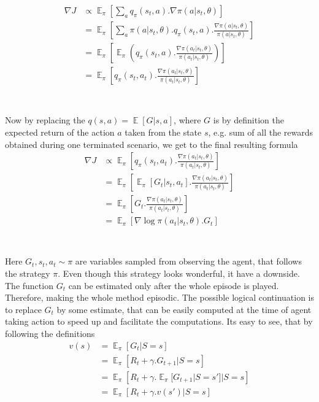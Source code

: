 \documentclass{article}
\DeclareMathOperator{\E}{\mathbb{E}}
\begin{document}
\begin{equation*}
    \begin{aligned}
    \nabla J
    &\propto \E_\pi \left[\sum_a q_\pi (s_t, a) .\nabla \pi(a |s_t, \theta)\right]\\
    &=\E_\pi \left[\sum_a \pi(a|s_t, \theta) .q_\pi(s_t, a) .\frac{\nabla \pi(a |s_t, \theta)}{\pi(a|s_t, \theta)}\right]\\
    &=\E_\pi \left[\E_\pi \left( q_\pi(s_t, a) .\frac{\nabla \pi(a_t |s_t, \theta)}{\pi(a_t|s_t, \theta)} \right)\right]\\
    &=\E_\pi \left[ q_\pi(s_t, a_t) .\frac{\nabla \pi(a_t |s_t, \theta)}{\pi(a_t|s_t, \theta)}\right]\\
    \end{aligned}
\end{equation*}
\\ \\ 
Now by replacing the $q(s, a) = \E [G|s,a]$, where $G$ is by definition the expected return of the action $a$ taken from the state $s$, e.g. sum of all the rewards obtained during one terminated scenario, we get to the final resulting formula
\begin{equation*}
    \begin{aligned}
    \nabla J
    &\propto \E_\pi \left[ q_\pi(s_t, a_t) .\frac{\nabla \pi(a_t |s_t, \theta)}{\pi(a_t|s_t, \theta)}\right]\\
    &=\E_\pi \left[ \E_\pi[G_t | s_t, a_t] .\frac{\nabla \pi(a_t |s_t, \theta)}{\pi(a_t|s_t, \theta)}\right]\\
    &=\E_\pi \left[ G_t .\frac{\nabla \pi(a_t |s_t, \theta)}{\pi(a_t|s_t, \theta)}\right]\\
    &=\E_\pi \left[ \nabla \log \pi(a_t |s_t, \theta) .G_t \right]\\
    \end{aligned}
\end{equation*}
\\ \\
Here $G_t, s_t, a_t \sim \pi$ are variables sampled from observing the agent, that follows the strategy $\pi$. Even though this strategy looks wonderful, it have a downside. The function $G_t$ can be estimated only after the whole episode is played. Therefore, making the whole method episodic. The possible logical continuation is to replace $G_t$ by some estimate, that can be easily computed at the time of agent taking action to speed up and facilitate the computations. Its easy to see, that by following the definitions
\begin{equation*}
    \begin{aligned}
    v(s)
    &= \E_\pi \left[ G_t | S = s \right]\\
    &= \E_\pi \left[ R_t + \gamma .G_{t+1} | S = s \right]\\
    &= \E_\pi \left[ R_t + \gamma .\E_\pi [G_{t+1} |S = s'] | S = s \right]\\
    &= \E_\pi \left[ R_t + \gamma .v(s') | S = s \right]\\
    \end{aligned}
\end{equation*}
\end{document}
